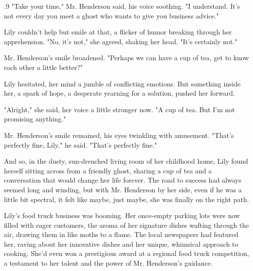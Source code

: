 \documentclass{article}
\newcommand{\Agentsroomzs}{\textsc{Agents' Room$_{ZS}$}}
\begin{document}
\begin{tcolorbox}[colback=white, colframe=gray!30!white, coltitle=black, parskip=5mm, title=
    \textbf{System output: \Agentsroomzs}, breakable]
\begin{spacing}{.9}
"Take your time," Mr. Henderson said, his voice soothing.  "I understand.  It's not every day you meet a ghost who wants to give you business advice."\\\par

Lily couldn't help but smile at that, a flicker of humor breaking through her apprehension.  "No, it's not," she agreed, shaking her head.  "It's certainly not."
\\\par
Mr. Henderson's smile broadened.  "Perhaps we can have a cup of tea, get to know each other a little better?"\\\par

Lily hesitated, her mind a jumble of conflicting emotions.  But something inside her, a spark of hope, a desperate yearning for a solution, pushed her forward.\\\par

"Alright," she said, her voice a little stronger now.  "A cup of tea.  But I'm not promising anything."\\\par

Mr. Henderson's smile remained, his eyes twinkling with amusement.  "That's perfectly fine, Lily," he said.  "That's perfectly fine."\\\par

And so, in the dusty, sun-drenched living room of her childhood home, Lily found herself sitting across from a friendly ghost, sharing a cup of tea and a conversation that would change her life forever.  The road to success had always seemed long and winding, but with Mr. Henderson by her side, even if he was a little bit spectral, it felt like maybe, just maybe, she was finally on the right path.\\\par

Lily’s food truck business was booming.  Her once-empty parking lots were now filled with eager customers, the aroma of her signature dishes wafting through the air, drawing them in like moths to a flame.  The local newspapers had featured her, raving about her innovative dishes and her unique, whimsical approach to cooking.  She’d even won a prestigious award at a regional food truck competition, a testament to her talent and the power of Mr. Henderson’s guidance.\\\par


\end{spacing}
\end{tcolorbox}
\end{document}
